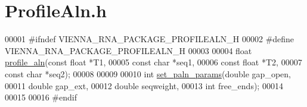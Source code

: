 \hypertarget{_profile_aln_8h_source}{}\section{Profile\+Aln.\+h}
\label{_profile_aln_8h_source}

\begin{DoxyCode}
00001 \textcolor{preprocessor}{#ifndef VIENNA\_RNA\_PACKAGE\_PROFILEALN\_H}
00002 \textcolor{preprocessor}{#define VIENNA\_RNA\_PACKAGE\_PROFILEALN\_H}
00003 
00004 \textcolor{keywordtype}{float} \mbox{\hyperlink{_profile_aln_8h_ad39b2710140d80c59ec6b416c20bf4e3}{profile\_aln}}(\textcolor{keyword}{const} \textcolor{keywordtype}{float} *T1,
00005                   \textcolor{keyword}{const} \textcolor{keywordtype}{char}  *seq1,
00006                   \textcolor{keyword}{const} \textcolor{keywordtype}{float} *T2,
00007                   \textcolor{keyword}{const} \textcolor{keywordtype}{char}  *seq2);
00008 
00009 
00010 \textcolor{keywordtype}{int} \mbox{\hyperlink{_profile_aln_8h_abbf75dbd44fe03e514297855b9e4c1e3}{set\_paln\_params}}(\textcolor{keywordtype}{double}  gap\_open,
00011                     \textcolor{keywordtype}{double}  gap\_ext,
00012                     \textcolor{keywordtype}{double}  seqweight,
00013                     \textcolor{keywordtype}{int}     free\_ends);
00014 
00015 
00016 \textcolor{preprocessor}{#endif}
\end{DoxyCode}
